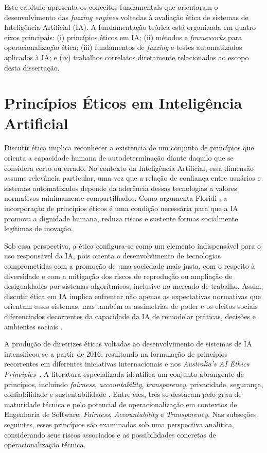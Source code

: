 \label{cap:fundamentacao}

Este capítulo apresenta os conceitos fundamentais que orientaram o desenvolvimento das \textit{fuzzing engines} voltadas à avaliação ética de sistemas de Inteligência Artificial (IA). A fundamentação teórica está organizada em quatro eixos principais: (i) princípios éticos em IA; (ii) métodos e \textit{frameworks} para operacionalização ética; (iii) fundamentos de \textit{fuzzing} e testes automatizados aplicados à IA; e (iv) trabalhos correlatos diretamente relacionados ao escopo desta dissertação.

\section{Princípios Éticos em Inteligência Artificial}
\label{sec:principios}

Discutir ética implica reconhecer a existência de um conjunto de princípios que orienta a capacidade humana de autodeterminação diante daquilo que se considera certo ou errado. No contexto da Inteligência Artificial, essa dimensão assume relevância particular, uma vez que a relação de confiança entre usuários e sistemas automatizados depende da aderência dessas tecnologias a valores normativos minimamente compartilhados. Como argumenta Floridi \cite{Floridi2018}, a incorporação de princípios éticos é uma condição necessária para que a IA promova a dignidade humana, reduza riscos e sustente formas socialmente legítimas de inovação.

Sob essa perspectiva, a ética configura-se como um elemento indispensável para o uso responsável da IA, pois orienta o desenvolvimento de tecnologias comprometidas com a promoção de uma sociedade mais justa, com o respeito à diversidade e com a mitigação dos riscos de reprodução ou ampliação de desigualdades por sistemas algorítmicos, inclusive no mercado de trabalho. Assim, discutir ética em IA implica enfrentar não apenas as expectativas normativas que orientam esses sistemas, mas também as assimetrias de poder e os efeitos sociais diferenciados decorrentes da capacidade da IA de remodelar práticas, decisões e ambientes sociais \cite{Floridi2018}.

A produção de diretrizes éticas voltadas ao desenvolvimento de sistemas de IA intensificou-se a partir de 2016, resultando na formulação de princípios recorrentes em diferentes iniciativas internacionais \cite{Jobin2019, UNESCO2021, EUAIAct2024} e nos \textit{Australia's AI Ethics Principles}~\cite{AustraliaAI2019}. A literatura especializada identifica um conjunto abrangente de princípios, incluindo \textit{fairness}, \textit{accountability}, \textit{transparency}, privacidade, segurança, confiabilidade e sustentabilidade \cite{Floridi2018, Jobin2019}. Entre eles, três se destacam pelo grau de maturidade técnica e pelo potencial de operacionalização em contextos de Engenharia de Software: \textit{Fairness}, \textit{Accountability} e \textit{Transparency}. Nas subseções seguintes, esses princípios são examinados sob uma perspectiva analítica, considerando seus riscos associados e as possibilidades concretas de operacionalização técnica.

